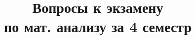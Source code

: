 \documentclass{article}
\title{%
	Вопросы к экзамену\\
	по мат. анализу за 4 семестр}
\date{}
\begin{document}
\theoremstyle{definition}
\newtheorem*{definition}{Определение}
\theoremstyle{plain}
\newtheorem{theorem}{Теорема}[section]
\newtheorem{axiom}{Аксиома}
\newtheorem{lemma}[theorem]{Лемма}
\newtheorem{statement}[theorem]{Утверждение}
\newtheorem{nb}[theorem]{N. B.}
\newtheorem{corollary}[theorem]{Следствие}
\theoremstyle{remark}
\newtheorem*{example}{Пример}
\newtheorem{property}[theorem]{Свойство}


\newcommand{\todo}{\textsc{\textbf{TODO}}}
\newcommand{\abs}[1]{\left|#1\right|}
\newcommand{\norm}[1]{\left\|#1\right\|}
\newcommand{\normp}[1]{\norm{#1}_p}
\newcommand{\normpp}[2]{\norm{#1}_{#2}}
\newcommand{\intl}[1]{\int\limits_{#1}}
\newcommand{\defeq}{\mathrel{\stackrel{\makebox[0pt]{\mbox{\normalfont\tiny def}}}{=}}}
\makeatletter
\newcommand*{\rom}[1]{\expandafter\@slowromancap\romannumeral #1@}
\makeatother
\newcommand{\iintl}[1]{\iint\limits_{#1}}
\newcommand{\pdiff}[2]{\frac{\partial #1}{\partial #2}}
\newcommand{\intlr}[2]{\int\limits_{#1}^{#2}}
\newcommand{\suml}[1]{\sum\limits_{#1}}
\newcommand{\sumlr}[2]{\sum\limits_{#1}^{#2}}
\newcommand{\feps}{\forall\varepsilon}
\newcommand{\Epsilon}{\varepsilon}
\newcommand{\scalarp}[2]{\langle #1 , #2\rangle}
\newcommand{\set}[1]{\left\{#1\right\}}
\maketitle
\end{document}
